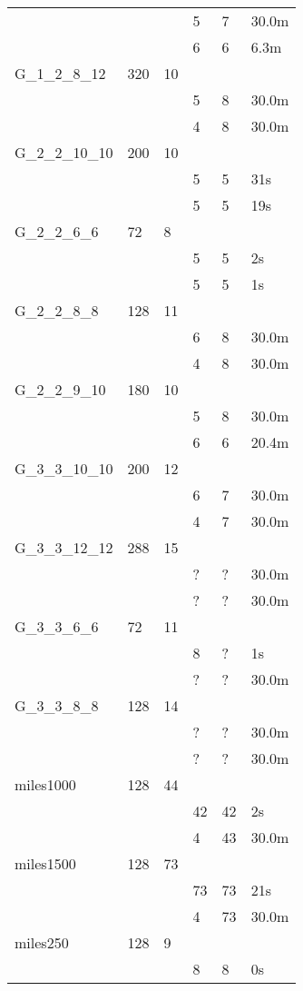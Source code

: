 \begin{table}[]
\begin{tabular}{|lll|l|l|l|}
&&&5  &7 &30.0m\\
\cline{4-6}
&&&6  &6 &6.3m\\
\cline{4-6}
\hline
G\_1\_2\_8\_12&320&10&&&\\
&&&5  &8 &30.0m\\
\cline{4-6}
&&&4  &8 &30.0m\\
\cline{4-6}
\hline
G\_2\_2\_10\_10&200&10&&&\\
&&&5  &5 &31s\\
\cline{4-6}
&&&5  &5 &19s\\
\cline{4-6}
\hline
G\_2\_2\_6\_6&72&8&&&\\
&&&5  &5 &2s\\
\cline{4-6}
&&&5  &5 &1s\\
\cline{4-6}
\hline
G\_2\_2\_8\_8&128&11&&&\\
&&&6  &8 &30.0m\\
\cline{4-6}
&&&4  &8 &30.0m\\
\cline{4-6}
\hline
G\_2\_2\_9\_10&180&10&&&\\
&&&5  &8 &30.0m\\
\cline{4-6}
&&&6  &6 &20.4m\\
\cline{4-6}
\hline
G\_3\_3\_10\_10&200&12&&&\\
&&&6  &7 &30.0m\\
\cline{4-6}
&&&4  &7 &30.0m\\
\cline{4-6}
\hline
G\_3\_3\_12\_12&288&15&&&\\
&&&?  &? &30.0m\\
\cline{4-6}
&&&?  &? &30.0m\\
\cline{4-6}
\hline
G\_3\_3\_6\_6&72&11&&&\\
&&&8  &? &1s\\
\cline{4-6}
&&&?  &? &30.0m\\
\cline{4-6}
\hline
G\_3\_3\_8\_8&128&14&&&\\
&&&?  &? &30.0m\\
\cline{4-6}
&&&?  &? &30.0m\\
\cline{4-6}
\hline
miles1000&128&44&&&\\
&&&42  &42 &2s\\
\cline{4-6}
&&&4  &43 &30.0m\\
\cline{4-6}
\hline
miles1500&128&73&&&\\
&&&73  &73 &21s\\
\cline{4-6}
&&&4  &73 &30.0m\\
\cline{4-6}
\hline
miles250&128&9&&&\\
&&&8  &8 &0s\\
\cline{4-6}

\end{tabular}
\end{table}
